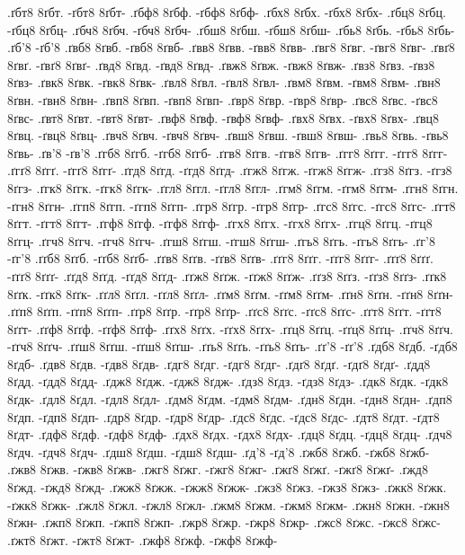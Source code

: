 {.ґбт8 8ґбт. -ґбт8 8ґбт-
.ґбф8 8ґбф. -ґбф8 8ґбф-
.ґбх8 8ґбх. -ґбх8 8ґбх-
.ґбц8 8ґбц. -ґбц8 8ґбц-
.ґбч8 8ґбч. -ґбч8 8ґбч-
.ґбш8 8ґбш. -ґбш8 8ґбш-
.ґбь8 8ґбь. -ґбь8 8ґбь-
.ґб'8 -ґб'8
.ґвб8 8ґвб. -ґвб8 8ґвб-
.ґвв8 8ґвв. -ґвв8 8ґвв-
.ґвг8 8ґвг. -ґвг8 8ґвг-
.ґвґ8 8ґвґ. -ґвґ8 8ґвґ-
.ґвд8 8ґвд. -ґвд8 8ґвд-
.ґвж8 8ґвж. -ґвж8 8ґвж-
.ґвз8 8ґвз. -ґвз8 8ґвз-
.ґвк8 8ґвк. -ґвк8 8ґвк-
.ґвл8 8ґвл. -ґвл8 8ґвл-
.ґвм8 8ґвм. -ґвм8 8ґвм-
.ґвн8 8ґвн. -ґвн8 8ґвн-
.ґвп8 8ґвп. -ґвп8 8ґвп-
.ґвр8 8ґвр. -ґвр8 8ґвр-
.ґвс8 8ґвс. -ґвс8 8ґвс-
.ґвт8 8ґвт. -ґвт8 8ґвт-
.ґвф8 8ґвф. -ґвф8 8ґвф-
.ґвх8 8ґвх. -ґвх8 8ґвх-
.ґвц8 8ґвц. -ґвц8 8ґвц-
.ґвч8 8ґвч. -ґвч8 8ґвч-
.ґвш8 8ґвш. -ґвш8 8ґвш-
.ґвь8 8ґвь. -ґвь8 8ґвь-
.ґв'8 -ґв'8
.ґгб8 8ґгб. -ґгб8 8ґгб-
.ґгв8 8ґгв. -ґгв8 8ґгв-
.ґгг8 8ґгг. -ґгг8 8ґгг-
.ґгґ8 8ґгґ. -ґгґ8 8ґгґ-
.ґгд8 8ґгд. -ґгд8 8ґгд-
.ґгж8 8ґгж. -ґгж8 8ґгж-
.ґгз8 8ґгз. -ґгз8 8ґгз-
.ґгк8 8ґгк. -ґгк8 8ґгк-
.ґгл8 8ґгл. -ґгл8 8ґгл-
.ґгм8 8ґгм. -ґгм8 8ґгм-
.ґгн8 8ґгн. -ґгн8 8ґгн-
.ґгп8 8ґгп. -ґгп8 8ґгп-
.ґгр8 8ґгр. -ґгр8 8ґгр-
.ґгс8 8ґгс. -ґгс8 8ґгс-
.ґгт8 8ґгт. -ґгт8 8ґгт-
.ґгф8 8ґгф. -ґгф8 8ґгф-
.ґгх8 8ґгх. -ґгх8 8ґгх-
.ґгц8 8ґгц. -ґгц8 8ґгц-
.ґгч8 8ґгч. -ґгч8 8ґгч-
.ґгш8 8ґгш. -ґгш8 8ґгш-
.ґгь8 8ґгь. -ґгь8 8ґгь-
.ґг'8 -ґг'8
.ґґб8 8ґґб. -ґґб8 8ґґб-
.ґґв8 8ґґв. -ґґв8 8ґґв-
.ґґг8 8ґґг. -ґґг8 8ґґг-
.ґґґ8 8ґґґ. -ґґґ8 8ґґґ-
.ґґд8 8ґґд. -ґґд8 8ґґд-
.ґґж8 8ґґж. -ґґж8 8ґґж-
.ґґз8 8ґґз. -ґґз8 8ґґз-
.ґґк8 8ґґк. -ґґк8 8ґґк-
.ґґл8 8ґґл. -ґґл8 8ґґл-
.ґґм8 8ґґм. -ґґм8 8ґґм-
.ґґн8 8ґґн. -ґґн8 8ґґн-
.ґґп8 8ґґп. -ґґп8 8ґґп-
.ґґр8 8ґґр. -ґґр8 8ґґр-
.ґґс8 8ґґс. -ґґс8 8ґґс-
.ґґт8 8ґґт. -ґґт8 8ґґт-
.ґґф8 8ґґф. -ґґф8 8ґґф-
.ґґх8 8ґґх. -ґґх8 8ґґх-
.ґґц8 8ґґц. -ґґц8 8ґґц-
.ґґч8 8ґґч. -ґґч8 8ґґч-
.ґґш8 8ґґш. -ґґш8 8ґґш-
.ґґь8 8ґґь. -ґґь8 8ґґь-
.ґґ'8 -ґґ'8
.ґдб8 8ґдб. -ґдб8 8ґдб-
.ґдв8 8ґдв. -ґдв8 8ґдв-
.ґдг8 8ґдг. -ґдг8 8ґдг-
.ґдґ8 8ґдґ. -ґдґ8 8ґдґ-
.ґдд8 8ґдд. -ґдд8 8ґдд-
.ґдж8 8ґдж. -ґдж8 8ґдж-
.ґдз8 8ґдз. -ґдз8 8ґдз-
.ґдк8 8ґдк. -ґдк8 8ґдк-
.ґдл8 8ґдл. -ґдл8 8ґдл-
.ґдм8 8ґдм. -ґдм8 8ґдм-
.ґдн8 8ґдн. -ґдн8 8ґдн-
.ґдп8 8ґдп. -ґдп8 8ґдп-
.ґдр8 8ґдр. -ґдр8 8ґдр-
.ґдс8 8ґдс. -ґдс8 8ґдс-
.ґдт8 8ґдт. -ґдт8 8ґдт-
.ґдф8 8ґдф. -ґдф8 8ґдф-
.ґдх8 8ґдх. -ґдх8 8ґдх-
.ґдц8 8ґдц. -ґдц8 8ґдц-
.ґдч8 8ґдч. -ґдч8 8ґдч-
.ґдш8 8ґдш. -ґдш8 8ґдш-
.ґд'8 -ґд'8
.ґжб8 8ґжб. -ґжб8 8ґжб-
.ґжв8 8ґжв. -ґжв8 8ґжв-
.ґжг8 8ґжг. -ґжг8 8ґжг-
.ґжґ8 8ґжґ. -ґжґ8 8ґжґ-
.ґжд8 8ґжд. -ґжд8 8ґжд-
.ґжж8 8ґжж. -ґжж8 8ґжж-
.ґжз8 8ґжз. -ґжз8 8ґжз-
.ґжк8 8ґжк. -ґжк8 8ґжк-
.ґжл8 8ґжл. -ґжл8 8ґжл-
.ґжм8 8ґжм. -ґжм8 8ґжм-
.ґжн8 8ґжн. -ґжн8 8ґжн-
.ґжп8 8ґжп. -ґжп8 8ґжп-
.ґжр8 8ґжр. -ґжр8 8ґжр-
.ґжс8 8ґжс. -ґжс8 8ґжс-
.ґжт8 8ґжт. -ґжт8 8ґжт-
.ґжф8 8ґжф. -ґжф8 8ґжф-
}

